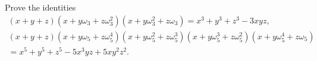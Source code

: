 Prove the identities
\begin{gather*}
(x + y + z) (x + y\omega_{3} + z\omega_{3}^{2})
            (x + y\omega_{3}^{2} + z\omega_{3})
  = x^{3} + y^{3} + z^{3} - 3xyz,\\
(x + y + z) (x + y\omega_{5} + z\omega_{5}^{4})
            (x + y\omega_{5}^{2} + z\omega_{5}^{3})
            (x + y\omega_{5}^{3} + z\omega_{5}^{2})
            (x + y\omega_{5}^{4} + z\omega_{5})\\
= x^{5} + y^{5} + z^{5} - 5x^{3}yz + 5xy^{2}z^{2}.
\end{gather*}

